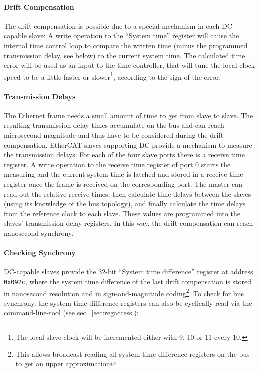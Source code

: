 \documentclass[a4paper,12pt,BCOR6mm,bibtotoc,idxtotoc]{scrbook}
\begin{document}
\paragraph{Drift Compensation} The drift compensation is possible due to a
special mechanism in each DC-capable slave: A write operation to the ``System
time'' register will cause the internal time control loop to compare the
written time (minus the programmed transmission delay, see below) to the
current system time. The calculated time error will be used as an input to the
time controller, that will tune the local clock speed to be a little faster or
slower\footnote{The local slave clock will be incremented either with
\unit{9}{\nano\second}, \unit{10}{\nano\second} or \unit{11}{\nano\second}
every \unit{10}{\nano\second}.}, according to the sign of the error.

\paragraph{Transmission Delays} The Ethernet frame needs a small amount of
time to get from slave to slave. The resulting transmission delay times
accumulate on the bus and can reach microsecond magnitude and thus have to be
considered during the drift compensation. EtherCAT slaves supporting DC
provide a mechanism to measure the transmission delays: For each of the four
slave ports there is a receive time register. A write operation to the receive
time register of port 0 starts the measuring and the current system time is
latched and stored in a receive time register once the frame is received on
the corresponding port. The master can read out the relative receive times,
then calculate time delays between the slaves (using its knowledge of the bus
topology), and finally calculate the time delays from the reference clock to
each slave. These values are programmed into the slaves' transmission delay
registers. In this way, the drift compensation can reach nanosecond synchrony.

\paragraph{Checking Synchrony} DC-capable slaves provide the 32-bit ``System
time difference'' register at address \lstinline+0x092c+, where the system
time difference of the last drift compensation is stored in nanosecond
resolution and in sign-and-magnitude coding\footnote{This allows
broadcast-reading all system time difference registers on the bus to get an
upper approximation}. To check for bus synchrony, the system time difference
registers can also be cyclically read via the command-line-tool (see
sec.~\ref{sec:regaccess}):
\end{document}

